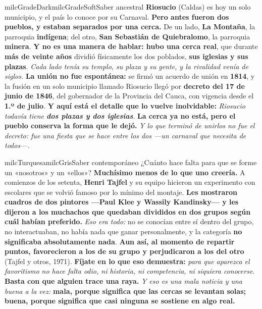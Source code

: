 \documentclass[11pt,letterpaper]{article}
\begin{document}
\begin{softbox}{milcGradeDark}{milcGradeSoft}{Saber ancestral}
\textbf{Riosucio} (Caldas) es hoy un solo municipio, y el país lo conoce por su Carnaval. \textbf{Pero antes fueron dos pueblos, y estaban separados por una cerca.} De un lado, \textbf{La Montaña}, la parroquia \textbf{indígena}; del otro, \textbf{San Sebastián de Quiebralomo}, la parroquia \textbf{minera}. \textbf{Y no es una manera de hablar: hubo una cerca real}, que durante \textbf{más de veinte años} dividió físicamente los dos poblados, \textbf{sus iglesias y sus plazas}. \emph{Cada lado tenía su templo, su plaza y su gente, y la rivalidad venía de siglos.} \textbf{La unión no fue espontánea:} se firmó un acuerdo de unión en \textbf{1814}, y la fusión en un solo municipio llamado Riosucio llegó por \textbf{decreto del 17 de junio de 1846}, del gobernador de la Provincia del Cauca, con vigencia desde el \textbf{1.º de julio}. \textbf{Y aquí está el detalle que lo vuelve inolvidable:} \emph{Riosucio todavía tiene \textbf{dos plazas y dos iglesias}}. \textbf{La cerca ya no está, pero el pueblo conserva la forma que le dejó.} \emph{Y lo que terminó de unirlos no fue el decreto: fue una fiesta que se hace entre los dos ---un carnaval que necesita de todos---.}
\end{softbox}

\begin{softbox}{milcTurquesa}{milcGris}{Saber contemporáneo}
¿Cuánto hace falta para que se forme un «nosotros» y un «ellos»? \textbf{Muchísimo menos de lo que uno creería.} A comienzos de los setenta, \textbf{Henri Tajfel} y su equipo hicieron un experimento con escolares que se volvió famoso por lo mínimo del montaje. \textbf{Les mostraron cuadros de dos pintores ---Paul Klee y Wassily Kandinsky--- y les dijeron a los muchachos que quedaban divididos en dos grupos según cuál habían preferido.} \emph{Eso era todo:} no se conocían entre sí dentro del grupo, no interactuaban, no había nada que ganar personalmente, y la categoría \textbf{no significaba absolutamente nada}. \textbf{Aun así, al momento de repartir puntos, favorecieron a los de su grupo y perjudicaron a los del otro} (Tajfel y otros, 1971). \textbf{Fíjate en lo que eso demuestra:} \emph{para que aparezca el favoritismo no hace falta odio, ni historia, ni competencia, ni siquiera conocerse}. \textbf{Basta con que alguien trace una raya.} \emph{Y eso es una mala noticia y una buena a la vez:} \textbf{mala, porque significa que las cercas se levantan solas; buena, porque significa que casi ninguna se sostiene en algo real.}
\end{softbox}
\end{document}
